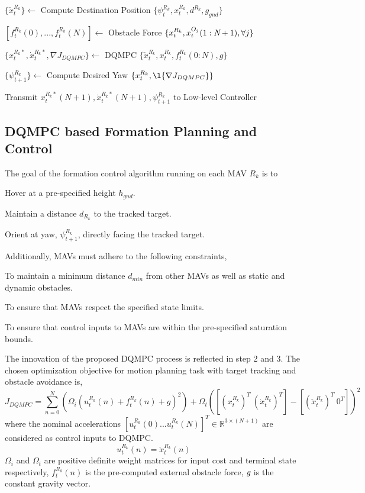 \documentclass[12pt]{article}
\begin{document}
\begin{asparaenum}[step 1:]
\item $\{\check{x}_{t}^{R_{k}}\} \leftarrow$ Compute Destination Position $\{\psi_{t}^{R_{k}},{x}_{t}^{R_{k}},{d}^{R_{k}},g_{gnd}\}$
\item $[{f}_{t}^{R_{k}}(0),...,{f}_{t}^{R_{k}}(N)] \leftarrow$ Obstacle Force $\{{x}_{t}^{R_{k}},{x}_{t}^{O_{j}}(1:\emph{N}+1),\forall{j}\}$
\item $\{{x}_{t}^{R_{k}*},{\dot{x}}_{t}^{R_{k}*},\nabla J_{DQMPC}\} \leftarrow$ DQMPC $\{{\check{x}}_{t}^{R_{k}},{x}_{t}^{R_{k}},{f}_{t}^{R_{k}}(0:N),g\}$
\item $\{{\psi}_{t+1}^{R_{k}}\} \leftarrow$ Compute Desired Yaw $\{{x}_{t}^{R_{k}},\l{\nabla J_{DQMPC}}\}$
\item Transmit ${x}_{t}^{R_{k}*}(N+1), {\dot{x}}_{t}^{R_{k}*}(N+1),{\psi}_{t+1}^{R_{k}}$ to Low-level Controller
\end{asparaenum}

\subsection{DQMPC based Formation Planning and Control}
The goal of the formation control algorithm running on each MAV $R_{k}$ is to
\begin{asparaenum}[1)]
\item Hover at a pre-specified height $h_{gnd}$.
\item Maintain a distance $d_{R_{k}}$ to the tracked target.
\item Orient at yaw, ${\psi}_{t+1}^{R_{k}}$, directly facing the tracked target.
\end{asparaenum}
Additionally, MAVs must adhere to the following constraints,
\begin{asparaenum}[1)]
\item To maintain a minimum distance $d_{min}$ from other MAVs as well as static and dynamic obstacles.
\item To ensure that MAVs respect the specified state limits.
\item To ensure that control inputs to MAVs are within the pre-specified saturation bounds.
\end{asparaenum}
The innovation of the proposed DQMPC process is reflected in step 2 and 3. The chosen optimization objective for motion planning task with target tracking and obstacle avoidance is, 
\begin{equation}
J_{DQMPC}=\sum_{n=0}^{N}(\Omega_{i}(u_{t}^{R_{k}}(n)+f_{t}^{R_{k}}(n)+g)^{2})+\Omega_{t}([({x}_{t}^{R_{k}})^{T}\ (\dot{x}_{t}^{R_{k}})^{T}]-[(\check{x}_{t}^{R_{k}})^{T}\ 0^{T}])^{2}
\end{equation}
where the nominal accelerations $[u_{t}^{R_{k}}(0)...u_{t}^{R_{k}}(N)]^{T} \in \mathbb{R}^{3\times(N+1)}$ are considered as control inputs to DQMPC.
\begin{equation}
u_{t}^{R_{k}}(n)=\ddot{x}_{t}^{R_{k}}(n)
\end{equation}
$\Omega_{i}$ and $\Omega_{t}$ are positive definite weight matrices for input cost and terminal state respectively, $f_{t}^{R_{k}}(n)$ is the pre-computed external obstacle force, $\emph{g}$ is the constant gravity vector.
\end{document}
